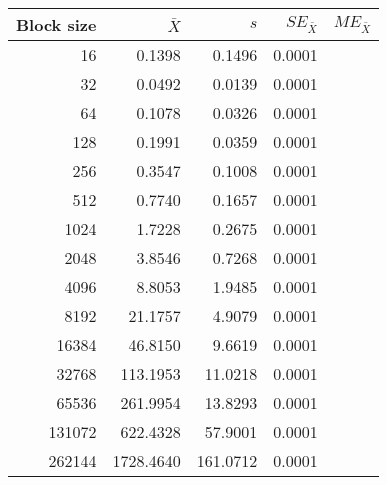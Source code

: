 \begin{tabular}{rrrrr}\toprule
{\small Block size} & $\bar{X}$ & $s$ & $SE_{\bar{X}}$ & $ME_{\bar{X}}$ \\\midrule
16 & 0.1398 & 0.1496 &  0.0001\\
32 & 0.0492 & 0.0139 &  0.0001\\
64 & 0.1078 & 0.0326 &  0.0001\\
128 & 0.1991 & 0.0359 &  0.0001\\
256 & 0.3547 & 0.1008 &  0.0001\\
512 & 0.7740 & 0.1657 &  0.0001\\
1024 & 1.7228 & 0.2675 &  0.0001\\
2048 & 3.8546 & 0.7268 &  0.0001\\
4096 & 8.8053 & 1.9485 &  0.0001\\
8192 & 21.1757 & 4.9079 &  0.0001\\
16384 & 46.8150 & 9.6619 &  0.0001\\
32768 & 113.1953 & 11.0218 &  0.0001\\
65536 & 261.9954 & 13.8293 &  0.0001\\
131072 & 622.4328 & 57.9001 &  0.0001\\
262144 & 1728.4640 & 161.0712 &  0.0001\\
\bottomrule
\end{tabular}
